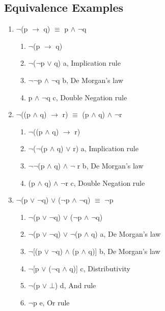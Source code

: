 \documentclass[12pt]{article}
\begin{document}
\subsection{Equivalence Examples}
\begin{enumerate}

  \item $\neg$(p $\to$ q) $\equiv$ p $\land$ $\neg$q
  \begin{enumerate}
    \item $\neg$(p $\to$ q)
    \item $\neg$($\neg$p $\lor$ q) \hfill a, Implication rule
    \item $\neg$$\neg$p $\land$ $\neg$q \hfill b, De Morgan's law
    \item p $\land$ $\neg$q \hfill c, Double Negation rule
  \end{enumerate}
  
  \item $\neg$((p $\land$ q) $\to$ r) $\equiv$ (p $\land$ q) $\land$ $\neg$r
  \begin{enumerate}
    \item $\neg$((p $\land$ q) $\to$ r)
    \item $\neg$($\neg$(p $\land$ q) $\lor$ r) \hfill a, Implication rule
    \item $\neg$$\neg$(p $\land$ q) $\land$ $\neg$ r \hfill b, De Morgan's law
    \item (p $\land$ q) $\land$ $\neg$r \hfill c, Double Negation rule
  \end{enumerate}

  \item $\neg$(p $\lor$ $\neg$q) $\lor$ ($\neg$p $\land$ $\neg$q) $\equiv$ $\neg$p
  \begin{enumerate}
    \item $\neg$(p $\lor$ $\neg$q) $\lor$ ($\neg$p $\land$ $\neg$q)
    \item $\neg$(p $\lor$ $\neg$q) $\lor$ $\neg$(p $\land$ q) \hfill a, De Morgan's law
    \item $\neg$[(p $\lor$ $\neg$q) $\land$ (p $\land$ q)] \hfill b, De Morgan's law
    \item $\neg$[p $\lor$ ($\neg$q $\land$ q)] \hfill c, Distributivity
    \item $\neg$(p $\lor$ $\bot$) \hfill d, And rule
    \item $\neg$p \hfill e, Or rule
  \end{enumerate}
\end{enumerate}
\end{document}
